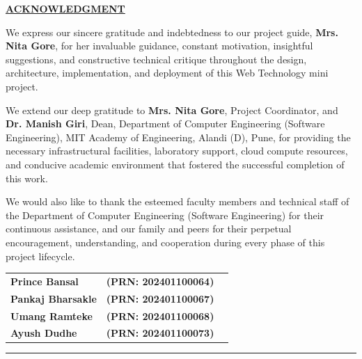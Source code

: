 \newpage
{}
\begin{center}
\vspace*{-12mm}
{\LARGE\textbf{\underline{ACKNOWLEDGMENT}}}\\[6mm]
\end{center}

We express our sincere gratitude and indebtedness to our project guide, \textbf{Mrs. Nita Gore}, for her invaluable guidance, constant motivation, insightful suggestions, and constructive technical critique throughout the design, architecture, implementation, and deployment of this Web Technology mini project.

We extend our deep gratitude to \textbf{Mrs. Nita Gore}, Project Coordinator, and \textbf{Dr. Manish Giri}, Dean, Department of Computer Engineering (Software Engineering), MIT Academy of Engineering, Alandi (D), Pune, for providing the necessary infrastructural facilities, laboratory support, cloud compute resources, and conducive academic environment that fostered the successful completion of this work.

We would also like to thank the esteemed faculty members and technical staff of the Department of Computer Engineering (Software Engineering) for their continuous assistance, and our family and peers for their perpetual encouragement, understanding, and cooperation during every phase of this project lifecycle.

\vspace{8mm}
\begin{flushleft}
\begin{tabular}{@{}p{6.5cm}l@{}l@{}}
\textbf{Prince Bansal} & \textbf{(PRN: 202401100064)} \\
\textbf{Pankaj Bharsakle} & \textbf{(PRN: 202401100067)} \\
\textbf{Umang Ramteke} & \textbf{(PRN: 202401100068)} \\
\textbf{Ayush Dudhe} & \textbf{(PRN: 202401100073)} \\
\end{tabular}
\vspace*{3mm}
\end{flushleft}

\vspace{8mm}
\rule{\textwidth}{0.01in}
\clearpage
